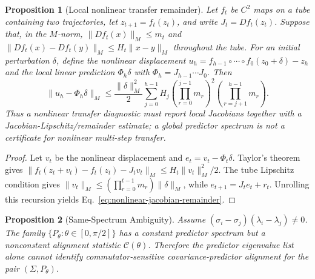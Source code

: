\documentclass{article}
\newtheorem{proposition}{Proposition}
\begin{document}
\begin{proposition}[Local nonlinear transfer remainder]
\label{prop:nonlinear-jacobian-remainder}
Let $f_t$ be $C^2$ maps on a tube containing two trajectories, let
$z_{t+1}=f_t(z_t)$, and write $J_t=Df_t(z_t)$. Suppose that, in the
$M$-norm, $\|Df_t(x)\|_M\leq m_t$ and
$\|Df_t(x)-Df_t(y)\|_M\leq H_t\|x-y\|_M$ throughout the tube. For an
initial perturbation $\delta$, define the nonlinear displacement
$u_h=f_{h-1}\circ\cdots\circ f_0(z_0+\delta)-z_h$ and the local linear
prediction $\Phi_h\delta$ with $\Phi_h=J_{h-1}\cdots J_0$. Then
\begin{equation}
\|u_h-\Phi_h\delta\|_M
\leq \frac{\|\delta\|_M^2}{2}
\sum_{j=0}^{h-1}H_j
\left(\prod_{r=0}^{j-1}m_r\right)^2
\left(\prod_{r=j+1}^{h-1}m_r\right).
\label{eq:nonlinear-jacobian-remainder}
\end{equation}
Thus a nonlinear transfer diagnostic must report local Jacobians together
with a Jacobian-Lipschitz/remainder estimate; a global predictor spectrum is
not a certificate for nonlinear multi-step transfer.
\end{proposition}

\begin{proof}
Let $v_t$ be the nonlinear displacement and $e_t=v_t-\Phi_t\delta$.
Taylor's theorem gives
$\|f_t(z_t+v_t)-f_t(z_t)-J_tv_t\|_M\leq H_t\|v_t\|_M^2/2$.
The tube Lipschitz condition gives
$\|v_t\|_M\leq(\prod_{r=0}^{t-1}m_r)\|\delta\|_M$,
while $e_{t+1}=J_te_t+r_t$. Unrolling this recursion yields
Eq.~\eqref{eq:nonlinear-jacobian-remainder}.
\end{proof}

\begin{proposition}[Same-Spectrum Ambiguity]
\label{prop:under-id}
Assume $(\sigma_i-\sigma_j)(\lambda_i-\lambda_j)\neq 0$. The family $\{P_\theta:\theta\in[0,\pi/2]\}$ has a constant predictor spectrum but a nonconstant alignment statistic $\mathcal{C}(\theta)$. Therefore the predictor eigenvalue list alone cannot identify commutator-sensitive covariance-predictor alignment for the pair $(\Sigma,P_\theta)$.
\end{proposition}
\end{document}
